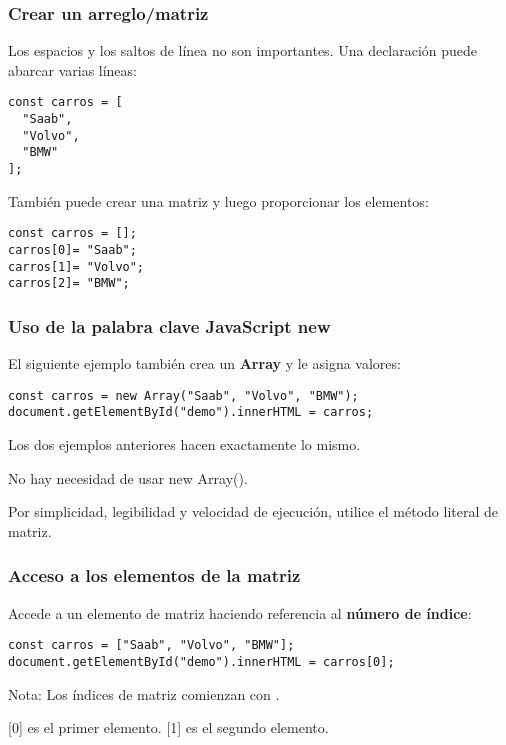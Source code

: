 \begin{frame}[fragile]
  \frametitle{Crear un arreglo/matriz}

  Los espacios y los saltos de línea no son importantes.
  Una declaración puede abarcar varias líneas:

  \vspace{\baselineskip}
  \begin{lstlisting}
const carros = [
  "Saab",
  "Volvo",
  "BMW"
]; 
  \end{lstlisting}

  \vspace{\baselineskip}
  También puede crear una matriz y luego proporcionar los elementos:

  \vspace{\baselineskip}
  \begin{lstlisting}
const carros = [];
carros[0]= "Saab";
carros[1]= "Volvo";
carros[2]= "BMW";
  \end{lstlisting}
\end{frame}

\begin{frame}[fragile]
  \frametitle{Uso de la palabra clave JavaScript new}

  El siguiente ejemplo también crea un \textbf{Array} y le asigna valores:

  \vspace{\baselineskip}
  \begin{lstlisting}
const carros = new Array("Saab", "Volvo", "BMW");
document.getElementById("demo").innerHTML = carros;
  \end{lstlisting}

  \begin{exampleblock}{}
    Los dos ejemplos anteriores hacen exactamente lo mismo.

    \vspace{\baselineskip}
    No hay necesidad de usar new Array().

    \vspace{\baselineskip}
    Por simplicidad, legibilidad y velocidad de ejecución,
    utilice el método literal de matriz.
  \end{exampleblock}
\end{frame}

\begin{frame}[fragile]
  \frametitle{Acceso a los elementos de la matriz}

  Accede a un elemento de matriz haciendo referencia al
  \textbf{número de índice}:

  \vspace{\baselineskip}
  \begin{lstlisting}
const carros = ["Saab", "Volvo", "BMW"];
document.getElementById("demo").innerHTML = carros[0];
  \end{lstlisting}

  \begin{exampleblock}{Nota:}
    Los índices de matriz comienzan con .

    \vspace{\baselineskip}
    [0] es el primer elemento. [1] es el segundo elemento.
  \end{exampleblock}
\end{frame}

